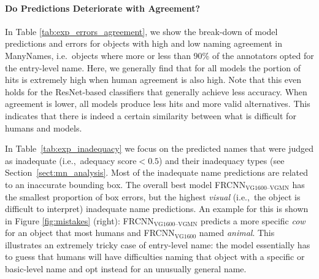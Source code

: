 \paragraph{Do Predictions Deteriorate with Agreement?}

In Table \ref{tab:exp_errors_agreement}, we show the break-down of model predictions and errors for objects with high and low naming agreement in ManyNames, i.e.\ objects where more or less than 90\% of the annotators opted for the entry-level name. 
Here, we generally find that for all models the portion of hits is extremely high when human agreement is also high.
Note that this even holds for the ResNet-based classifiers that generally achieve less accuracy.
When agreement is lower, all models produce less hits and more valid alternatives. 
This indicates that there is indeed a certain similarity between what is difficult for humans and models.


In Table~\ref{tab:exp_inadequacy} we focus on the predicted \mn names that were judged as inadequate (i.e.,~adequacy score\mbox{$<0.5$}) and their inadequacy types (see Section~\ref{sect:mn_analysis}.
Most of the inadequate name predictions are related to an inaccurate bounding box. 
The overall best model FRCNN$_{\text{VG1600--VGMN}}$ has the smallest proportion of box errors, but the highest \textit{visual} (i.e.,~the object is difficult to interpret) inadequate name predictions. 
An example for this is shown in Figure \ref{fig:mistakes} (right): FRCNN$_{\text{VG1600--VGMN}}$  predicts a more specific \textit{cow} for an object that most humans and FRCNN$_{\text{VG1600}}$ named \textit{animal}.
This illustrates an extremely tricky case of entry-level name: the model essentially has to guess that humans will have difficulties naming that object with a specific or basic-level name and opt instead for an unusually general name. 

